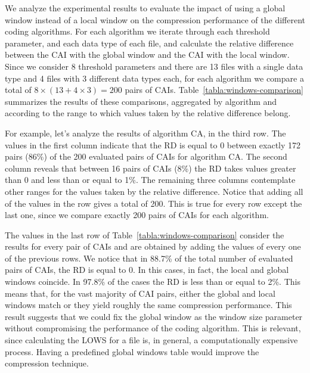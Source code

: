 We analyze the experimental results to evaluate the impact of using a global window instead of a local window on the compression performance of the different coding algorithms. For each algorithm we iterate through each threshold parameter, and each data type of each file, and calculate the relative difference between the CAI with the global window and the CAI with the local window. Since we consider 8 threshold parameters and there are 13 files with a single data type and 4 files with 3 different data types each, for each algorithm we compare a total of $8 \times (13 + 4\times3) = 200$ pairs of CAIs. Table~\ref{tabla:windows-comparison} summarizes the results of these comparisons, aggregated by algorithm and according to the range to which values taken by the relative difference belong. 


For example, let's analyze the results of algorithm CA, in the third row. The values in the first column indicate that the RD is equal to 0 between exactly 172 pairs (86\%) of the 200 evaluated pairs of CAIs for algorithm CA. The second column reveals that between 16 pairs of CAIs (8\%) the RD takes values greater than 0 and less than or equal to 1\%. The remaining three columns contemplate other ranges for the values taken by the relative difference. Notice that adding all of the values in the row gives a total of 200. This is true for every row except the last one, since we compare exactly 200 pairs of CAIs for each algorithm.


\clearpage


\clearpage



\vspace{-5pt}


The values in the last row of Table~\ref{tabla:windows-comparison} consider the results for every pair of CAIs and are obtained by adding the values of every one of the previous rows. We notice that in 88.7\% of the total number of evaluated pairs of CAIs, the RD is equal to 0. In this cases, in fact, the local and global windows coincide. In 97.8\% of the cases the RD is less than or equal to 2\%. This means that, for the vast majority of CAI pairs, either the global and local windows match or they yield roughly the same compression performance. This result suggests that we could fix the global window as the window size parameter without compromising the performance of the coding algorithm. This is relevant, since calculating the LOWS for a file is, in general, a computationally expensive process. Having a predefined global windows table would improve the compression technique.


